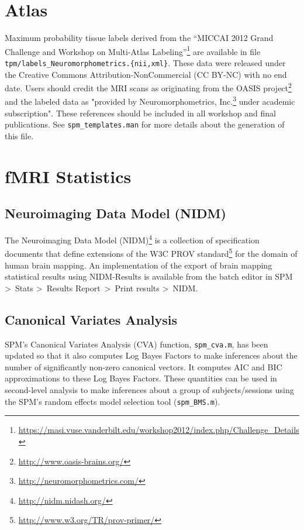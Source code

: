 \documentclass[a4paper,titlepage,openany]{article}
\begin{document}
\section{Atlas}

Maximum probability tissue labels derived from the ``MICCAI 2012 Grand Challenge and Workshop on Multi-Atlas Labeling''\footnote{\url{https://masi.vuse.vanderbilt.edu/workshop2012/index.php/Challenge_Details}} are available in file \texttt{tpm/labels\_Neuromorphometrics.\{nii,xml\}}.
These data were released under the Creative Commons Attribution-NonCommercial (CC BY-NC) with no end date. Users should credit the MRI scans as originating from the OASIS project\footnote{\url{http://www.oasis-brains.org/}} and the labeled data as "provided by Neuromorphometrics, Inc.\footnote{\url{http://neuromorphometrics.com/}} under academic subscription". These references should be included in all workshop and final publications.
See \texttt{spm\_templates.man} for more details about the generation of this file.

\section{fMRI Statistics}

\subsection{Neuroimaging Data Model (NIDM)}

The Neuroimaging Data Model (NIDM)\footnote{\url{http://nidm.nidash.org/}} is a collection of specification documents that define extensions of the W3C PROV standard\footnote{\url{http://www.w3.org/TR/prov-primer/}} for the domain of human brain mapping.
An implementation of the export of brain mapping statistical results using NIDM-Results \cite{Maumet2014} is available from the batch editor in SPM \textgreater\ Stats \textgreater\ Results Report\ \textgreater\ Print results \textgreater\ NIDM.

\subsection{Canonical Variates Analysis}

SPM's Canonical Variates Analysis (CVA) function, \texttt{spm\_cva.m}, has been updated so that it also computes Log Bayes Factors to make inferences about the number of significantly non-zero canonical vectors. It computes AIC and BIC approximations to these Log Bayes Factors. These quantities can be used in second-level analysis to make inferences about a group of subjects/sessions using the SPM's random effects model selection tool (\texttt{spm\_BMS.m}).
\end{document}

